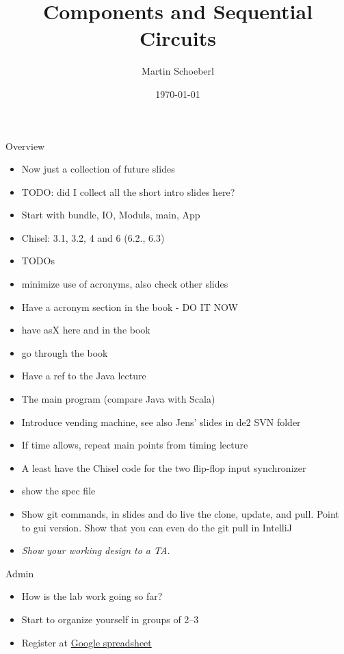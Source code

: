 

\newif\ifbook



\title{Components and Sequential Circuits}
\author{Martin Schoeberl}
\date{\today}



\begin{frame}
\titlepage
\end{frame}


\begin{frame}[fragile]{Overview}
\begin{itemize}
\item Now just a collection of future slides
\item TODO: did I collect all the short intro slides here?
\item Start with bundle, IO, Moduls, main, App
\item Chisel: 3.1, 3.2, 4 and 6 (6.2., 6.3)
\item TODOs
\item minimize use of acronyms, also check other slides
\item Have a acronym section in the book - DO IT NOW
\item have asX here and in the book
\item go through the book
\item Have a ref to the Java lecture
\item The main program (compare Java with Scala)
\item Introduce vending machine, see also Jens' slides in de2 SVN folder
\item If time allows, repeat main points from timing lecture
\item A least have the Chisel code for the two flip-flop input synchronizer
\item show the spec file
\item Show git commands, in slides and do live the clone, update, and pull. Point to gui version. Show that you can even do the git pull in IntelliJ
\item \emph{Show your working design to a TA.}
\end{itemize}
\end{frame}

\begin{frame}[fragile]{Admin}
\begin{itemize}
\item How is the lab work going so far?
\item Start to organize yourself in groups of 2--3
\item Register at \href{https://docs.google.com/spreadsheets/d/1Hp81EyFYYvjm336DrwtCym9oRQUEzRKe6VceFp0ZCAQ/edit?usp=sharing}{Google spreadsheet}
\end{itemize}
\end{frame}


